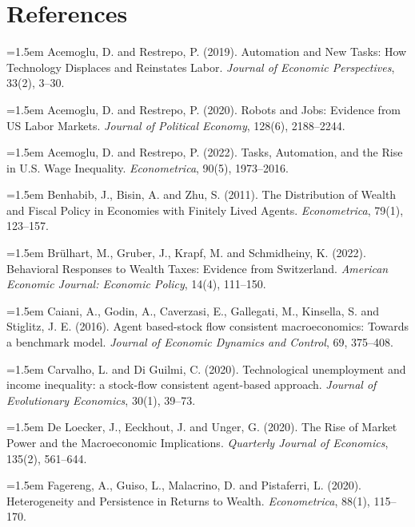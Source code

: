 \documentclass[11pt]{article}
\begin{document}
\section*{References}
\small
\begingroup\setlength{\parindent}{0pt}
\hangindent=1.5em Acemoglu, D. and Restrepo, P. (2019). Automation and New Tasks: How Technology Displaces and Reinstates Labor. \textit{Journal of Economic Perspectives}, 33(2), 3--30.\par\addvspace{0.45em}
\hangindent=1.5em Acemoglu, D. and Restrepo, P. (2020). Robots and Jobs: Evidence from US Labor Markets. \textit{Journal of Political Economy}, 128(6), 2188--2244.\par\addvspace{0.45em}
\hangindent=1.5em Acemoglu, D. and Restrepo, P. (2022). Tasks, Automation, and the Rise in U.S. Wage Inequality. \textit{Econometrica}, 90(5), 1973--2016.\par\addvspace{0.45em}
\hangindent=1.5em Benhabib, J., Bisin, A. and Zhu, S. (2011). The Distribution of Wealth and Fiscal Policy in Economies with Finitely Lived Agents. \textit{Econometrica}, 79(1), 123--157.\par\addvspace{0.45em}
\hangindent=1.5em Brülhart, M., Gruber, J., Krapf, M. and Schmidheiny, K. (2022). Behavioral Responses to Wealth Taxes: Evidence from Switzerland. \textit{American Economic Journal: Economic Policy}, 14(4), 111--150.\par\addvspace{0.45em}
\hangindent=1.5em Caiani, A., Godin, A., Caverzasi, E., Gallegati, M., Kinsella, S. and Stiglitz, J. E. (2016). Agent based-stock flow consistent macroeconomics: Towards a benchmark model. \textit{Journal of Economic Dynamics and Control}, 69, 375--408.\par\addvspace{0.45em}
\hangindent=1.5em Carvalho, L. and Di Guilmi, C. (2020). Technological unemployment and income inequality: a stock-flow consistent agent-based approach. \textit{Journal of Evolutionary Economics}, 30(1), 39--73.\par\addvspace{0.45em}
\hangindent=1.5em De Loecker, J., Eeckhout, J. and Unger, G. (2020). The Rise of Market Power and the Macroeconomic Implications. \textit{Quarterly Journal of Economics}, 135(2), 561--644.\par\addvspace{0.45em}
\hangindent=1.5em Fagereng, A., Guiso, L., Malacrino, D. and Pistaferri, L. (2020). Heterogeneity and Persistence in Returns to Wealth. \textit{Econometrica}, 88(1), 115--170.\par\addvspace{0.45em}
\end{document}
